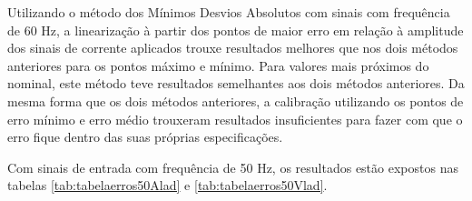 \begin{table}[H]
\end{table}

Utilizando o método dos Mínimos Desvios Absolutos com sinais com frequência de 60 Hz, a linearização à partir dos pontos de maior erro em relação à amplitude dos sinais de corrente aplicados trouxe resultados melhores que nos dois métodos anteriores para os pontos máximo e mínimo. Para valores mais próximos do nominal, este método teve resultados semelhantes aos dois métodos anteriores. Da mesma forma que os dois métodos anteriores, a calibração utilizando os pontos de erro mínimo e erro médio trouxeram resultados insuficientes para fazer com que o erro fique dentro das suas próprias especificações.

Com sinais de entrada com frequência de 50 Hz, os resultados estão expostos nas tabelas \ref{tab:tabelaerros50Alad} e \ref{tab:tabelaerros50Vlad}.

